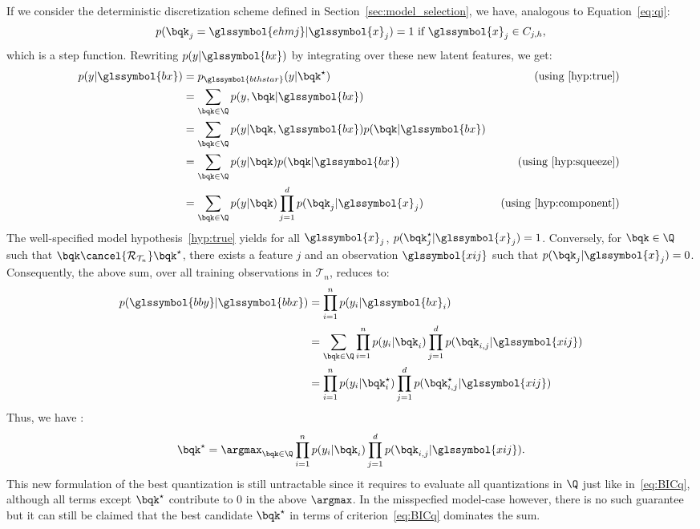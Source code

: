 If we consider the deterministic discretization scheme defined in Section~\ref{sec:model_selection}, we have, analogous to Equation~\eqref{eq:qj}:
$$
p(\bqk_j = \glssymbol{ehmj} | \glssymbol{x}_j) = 1 \text{ if } \glssymbol{x}_j \in C_{j,h},
$$
which is a step function. Rewriting $p(y| \glssymbol{bx})$ by integrating over these new latent features,
we get:
\begin{align*}
p(y | \glssymbol{bx}) & = p_{\glssymbol{bthstar}}(y | \bqk^\star) & \text{ (using \eqref{hyp:true}) } \\
& = \sum_{\bqk \in \Q} p(y, \bqk | \glssymbol{bx}) \\
& = \sum_{\bqk \in \Q} p(y | \bqk, \glssymbol{bx}) p(\bqk | \glssymbol{bx}) \\
& = \sum_{\bqk \in \Q} p(y | \bqk) p(\bqk | \glssymbol{bx}) & \text{ (using \eqref{hyp:squeeze}) } \\
& = \sum_{\bqk \in \Q} p(y | \bqk) \prod_{j=1}^d p(\bqk_j | \glssymbol{x}_j) & \text{ (using \eqref{hyp:component}) }
\end{align*}
The well-specified model hypothesis~\eqref{hyp:true} yields for all $\glssymbol{x}_j$, $p(\bqk_j^\star | \glssymbol{x}_j) = 1$. Conversely, for $\bqk \in \Q$ such that $\bqk \cancel{\mathcal{R}_{\mathcal{T}_n}} \bqk^\star$, there exists a feature $j$ and an observation $\glssymbol{xij}$ such that $p(\bqk_j | \glssymbol{x}_j) = 0$. Consequently, the above sum, over all training observations in $\mathcal{T}_n$, reduces to:
\begin{align*}
p(\glssymbol{bby} | \glssymbol{bbx}) & = \prod_{i=1}^n p(y_i | \glssymbol{bx}_i) \\
 & = \sum_{\bqk \in \Q} \prod_{i=1}^n p(y_i | \bqk_i) \prod_{j=1}^d p(\bqk_{i,j} | \glssymbol{xij}) \\
 & = \prod_{i=1}^n p(y_i | \bqk_i^\star) \prod_{j=1}^d p(\bqk_{i,j}^\star | \glssymbol{xij})
\end{align*}
Thus, we have :
\[ \bqk^\star = \argmax_{\bqk \in \Q} \prod_{i=1}^n p(y_i | \bqk_i ) \prod_{j=1}^d p(\bqk_{i,j} | \glssymbol{xij}). \]
This new formulation of the best quantization is still untractable since it requires to evaluate all quantizations in $\Q$ just like in~\eqref{eq:BICq}, although all terms except $\bqk^\star$ contribute to $0$ in the above $\argmax$. In the misspecfied model-case however, there is no such guarantee but it can still be claimed that the best candidate $\bqk^\star$ in terms of criterion~\eqref{eq:BICq} dominates the sum.

